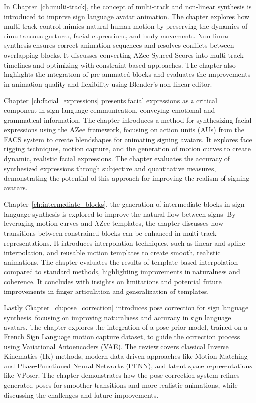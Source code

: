\documentclass[../../main.tex]{subfiles}
\begin{document}
In Chapter~\ref{ch:multi-track}, the concept of multi-track and non-linear synthesis is introduced to improve sign language avatar animation. The chapter explores how multi-track control mimics natural human motion by preserving the dynamics of simultaneous gestures, facial expressions, and body movements. Non-linear synthesis ensures correct animation sequences and resolves conflicts between overlapping blocks. It discusses converting AZee Synced Scores into multi-track timelines and optimizing with constraint-based approaches. The chapter also highlights the integration of pre-animated blocks and evaluates the improvements in animation quality and flexibility using Blender's non-linear editor.

Chapter~\ref{ch:facial_expressions} presents facial expressions as a critical component in sign language communication, conveying emotional and grammatical information. The chapter introduces a method for synthesizing facial expressions using the AZee framework, focusing on action units (AUs) from the FACS system to create blendshapes for animating signing avatars. It explores face rigging techniques, motion capture, and the generation of motion curves to create dynamic, realistic facial expressions. The chapter evaluates the accuracy of synthesized expressions through subjective and quantitative measures, demonstrating the potential of this approach for improving the realism of signing avatars.

Chapter~\ref{ch:intermediate_blocks}, the generation of intermediate blocks in sign language synthesis is explored to improve the natural flow between signs. By leveraging motion curves and AZee templates, the chapter discusses how transitions between constrained blocks can be enhanced in multi-track representations. It introduces interpolation techniques, such as linear and spline interpolation, and reusable motion templates to create smooth, realistic animations. The chapter evaluates the results of template-based interpolation compared to standard methods, highlighting improvements in naturalness and coherence. It concludes with insights on limitations and potential future improvements in finger articulation and generalization of templates.

Lastly Chapter~\ref{ch:pose_correction} introduces pose correction for sign language synthesis, focusing on improving naturalness and accuracy in sign language avatars. The chapter explores the integration of a pose prior model, trained on a French Sign Language motion capture dataset, to guide the correction process using Variational Autoencoders (VAE). The review covers classical Inverse Kinematics (IK) methods, modern data-driven approaches like Motion Matching and Phase-Functioned Neural Networks (PFNN), and latent space representations like VPoser. The chapter demonstrates how the pose correction system refines generated poses for smoother transitions and more realistic animations, while discussing the challenges and future improvements.
\end{document}
